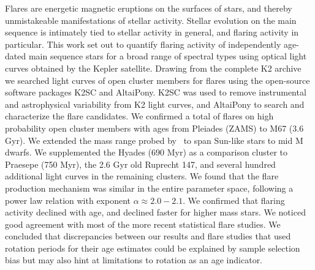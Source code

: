 \documentclass{aa}
\begin{document}
  \abstract
   {Flares are energetic magnetic eruptions on the surfaces of stars, and thereby unmistakeable manifestations of stellar activity. Stellar evolution on the main sequence is intimately tied to stellar activity in general, and flaring activity in particular.}
   {This work set out to quantify flaring activity of independently age-dated main sequence stars for a broad range of spectral types using optical light curves obtained by the Kepler satellite.}
   {Drawing from the complete K2 archive we searched light curves of open cluster members for flares using the open-source software packages K2SC and AltaiPony. K2SC was used to remove instrumental and astrophysical variability from K2 light curves, and AltaiPony to search and characterize the flare candidates.}
   {We confirmed a total of flares on high probability open cluster members with ages from Pleiades (ZAMS) to M67 (3.6 Gyr). We extended the mass range probed by~\citet{ilin2019} to span Sun-like stars to mid M dwarfs. We supplemented the Hyades (690 Myr) as a comparison cluster to Praesepe (750 Myr), the 2.6 Gyr old Ruprecht 147, and several hundred additional light curves in the remaining clusters. We found that the flare production mechanism was similar in the entire parameter space, following a power law relation with exponent $\alpha\approx 2.0-2.1$. We confirmed that flaring activity declined with age, and declined faster for higher mass stars. We noticed good agreement with most of the more recent statistical flare studies. We concluded that discrepancies between our results and flare studies that used rotation periods for their age estimates could be explained by sample selection bias but may also hint at limitations to rotation as an age indicator.}
  {}
   \maketitle
\end{document}
